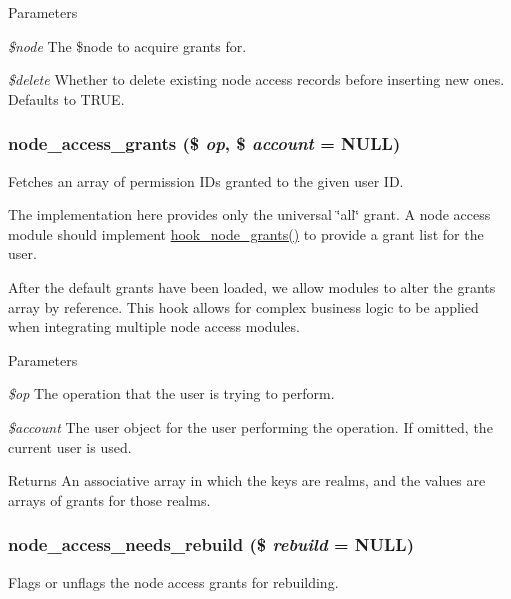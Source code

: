 \begin{DoxyParams}{Parameters}
\item[{\em \$node}]The \$node to acquire grants for.\item[{\em \$delete}]Whether to delete existing node access records before inserting new ones. Defaults to TRUE. \end{DoxyParams}
\hypertarget{group__node__access_gab33de8c23b1edb657f67cb242a8ec8af}{
\subsubsection[{node\_\-access\_\-grants}]{\setlength{\rightskip}{0pt plus 5cm}node\_\-access\_\-grants (\$ {\em op}, \/  \$ {\em account} = {\ttfamily NULL})}}
\label{group__node__access_gab33de8c23b1edb657f67cb242a8ec8af}
Fetches an array of permission IDs granted to the given user ID.

The implementation here provides only the universal \char`\"{}all\char`\"{} grant. A node access module should implement \hyperlink{group__node__access_gaa973f2ab6ab14c3fa14e5138c6d69ecf}{hook\_\-node\_\-grants()} to provide a grant list for the user.

After the default grants have been loaded, we allow modules to alter the grants array by reference. This hook allows for complex business logic to be applied when integrating multiple node access modules.


\begin{DoxyParams}{Parameters}
\item[{\em \$op}]The operation that the user is trying to perform. \item[{\em \$account}]The user object for the user performing the operation. If omitted, the current user is used.\end{DoxyParams}
\begin{DoxyReturn}{Returns}
An associative array in which the keys are realms, and the values are arrays of grants for those realms. 
\end{DoxyReturn}
\hypertarget{group__node__access_ga895d95595168709334c4eca1472c6d23}{
\subsubsection[{node\_\-access\_\-needs\_\-rebuild}]{\setlength{\rightskip}{0pt plus 5cm}node\_\-access\_\-needs\_\-rebuild (\$ {\em rebuild} = {\ttfamily NULL})}}
\label{group__node__access_ga895d95595168709334c4eca1472c6d23}
Flags or unflags the node access grants for rebuilding.

